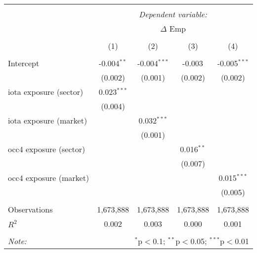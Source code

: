 \begin{tabular}{@{\extracolsep{5pt}}lcccc}
\\[-1.8ex]\hline
\hline \\[-1.8ex]
& \multicolumn{4}{c}{\textit{Dependent variable:}} \
\cr \cline{4-5}
\\[-1.8ex] & \multicolumn{4}{c}{$\Delta$ Emp}  \\
\\[-1.8ex] & (1) & (2) & (3) & (4) \\
\hline \\[-1.8ex]
 Intercept & -0.004$^{**}$ & -0.004$^{***}$ & -0.003$^{}$ & -0.005$^{***}$ \\
  & (0.002) & (0.001) & (0.002) & (0.002) \\
 iota exposure (sector) & 0.023$^{***}$ & & & \\
  & (0.004) & & & \\
 iota exposure (market) & & 0.032$^{***}$ & & \\
  & & (0.001) & & \\
 occ4 exposure (sector) & & & 0.016$^{**}$ & \\
  & & & (0.007) & \\
 occ4 exposure (market) & & & & 0.015$^{***}$ \\
  & & & & (0.005) \\
\hline \\[-1.8ex]
 Observations & 1,673,888 & 1,673,888 & 1,673,888 & 1,673,888 \\
 $R^2$ & 0.002 & 0.003 & 0.000 & 0.001 \\
\hline
\hline \\[-1.8ex]
\textit{Note:} & \multicolumn{4}{r}{$^{*}$p$<$0.1; $^{**}$p$<$0.05; $^{***}$p$<$0.01} \\
\end{tabular}